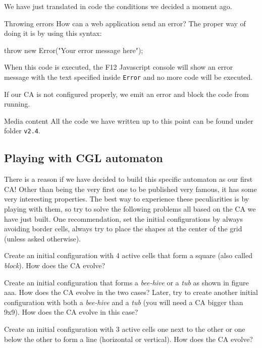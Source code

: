 We have just translated in code the conditions we decided a moment ago.

\begin{tips}{Throwing errors}
How can a web application send an error? The proper way of doing it is by using this syntax:
\begin{code}
throw new Error("Your error message here");
\end{code}
When this code is executed, the F12 Javascript console will show an error message with the text
specified inside \texttt{Error} and no more code will be executed.
\end{tips}

If our CA is not configured properly, we emit an error and block the code from running.

\begin{trailer}{Media content}
All the code we have written up to this point can be found under folder \texttt{v2.4}.
\end{trailer}

\subsection{Playing with CGL automaton}
There is a reason if we have decided to build this specific automaton as our first CA! Other than being
the very first one to be published very famous, it has some very interesting properties.
The best way to experience these peculiarities is by playing with them, so try to
solve the following problems all based on the CA we have just built. One recommendation,
set the initial configurations by always avoiding border cells, always try to place
the shapes at the center of the grid (unless asked otherwise).

\begin{problem}
\label{prob:cgl1}
Create an initial configuration with 4 active cells that form a square (also called \textit{block}).
How does the CA evolve?
\end{problem}

\begin{problem}
\label{prob:cgl2}
Create an initial configuration that forms a \textit{bee-hive} or
a \textit{tub} as shown in figure aaa.
How does the CA evolve in the two cases?
Later, try to create another initial configuration with both a
\textit{bee-hive} and a \textit{tub} (you will need a CA bigger than 9x9).
How does the CA evolve in this case?
\end{problem}

\begin{problem}
\label{prob:cgl3}
Create an initial configuration with 3 active cells one next to the other or one
below the other to form a line (horizontal or vertical).
How does the CA evolve?
\end{problem}

